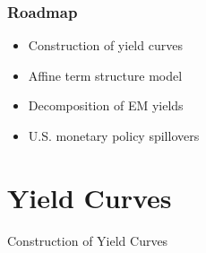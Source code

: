 \documentclass[12pt, aspectratio=169, xcolor=dvipsnames]{beamer}  %
\begin{document}


\begin{frame}
	\frametitle{Roadmap}
	\begin{itemize}
		\item Construction of yield curves
		\item Affine term structure model
		\item Decomposition of EM yields
		\item U.S. monetary policy spillovers
	\end{itemize}
\end{frame}

\section{Yield Curves}

\begin{frame}
\begin{center}
	\huge \textcolor{yaleblue}{Construction of Yield Curves}
\end{center}
\end{frame}
\end{document}
